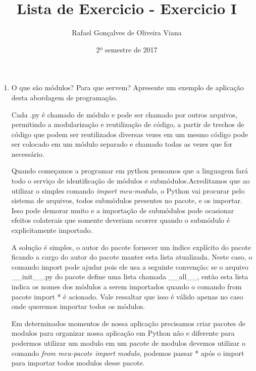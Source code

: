 \documentclass[12pt]{article}
\title{Lista de Exercicio  - Exercicio I }
\author{Rafael Gonçalves de  Oliveira Viana}
\date{2º semestre de 2017}
\begin{document}
\maketitle

\begin{enumerate}
\item
O que são módulos? Para que servem? Apresente um exemplo de aplicação desta
abordagem de programação.

Cada .py é chamado de módulo e pode ser chamado por outros arquivos, permitindo a modularização e reutilização de código, a partir de trechos de código que podem ser reutilizados diversas vezes em um mesmo código pode ser colocado em um módulo separado e chamado todas as vezes que for necessário.

Quando começamos a programar em python pensamos que a linguagem fará todo o serviço de identificação de módulos e submódulos.Acreditamos que ao utilizar o simples comando \textit{import meu-modulo}, o Python vai procurar pelo sistema de arquivos, todos submódulos presentes no pacote, e os importar. Isso pode demorar muito e a importação de submódulos pode ocasionar efeitos colaterais que somente deveriam ocorrer quando o submódulo é explicitamente importado.

A solução é simples, o autor do pacote fornecer um índice explícito do pacote ficando a cargo do autor do pacote manter esta lista atualizada. Neste caso, o comando import pode ajudar pois ele usa a seguinte convenção: se o arquivo \_\_init\_\_.py do pacote define uma lista chamada \_\_all\_\_, então esta lista indica os nomes dos módulos a serem importados quando o comando from pacote import * é acionado. Vale ressaltar que isso é válido apenas no caso onde queremos importar todos os módulos.

Em determinados momentos de nossa aplicação precisamos criar pacotes de modulos para organizar nossa aplicação em Python não e diferente para podermos utilizar um modulo em um pacote de modulos devemos utilizar o comando \textit{from meu-pacote import modulo}, podemos passar * após o import para importar todos modulos desse pacote.


\end{enumerate}
\end{document}
